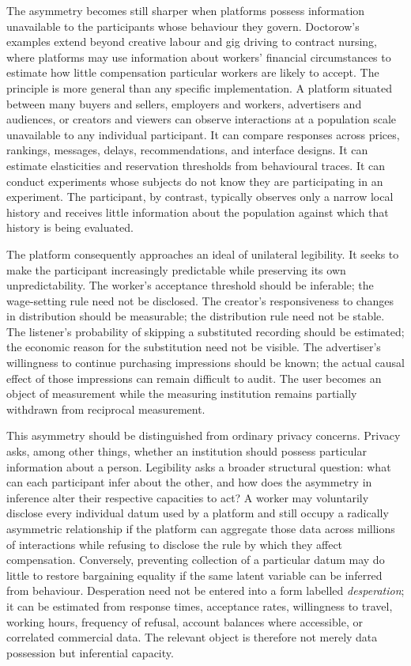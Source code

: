 \documentclass[11pt]{article}
\begin{document}
The asymmetry becomes still sharper when platforms possess information unavailable to the participants whose behaviour they govern. Doctorow's examples extend beyond creative labour and gig driving to contract nursing, where platforms may use information about workers' financial circumstances to estimate how little compensation particular workers are likely to accept. The principle is more general than any specific implementation. A platform situated between many buyers and sellers, employers and workers, advertisers and audiences, or creators and viewers can observe interactions at a population scale unavailable to any individual participant. It can compare responses across prices, rankings, messages, delays, recommendations, and interface designs. It can estimate elasticities and reservation thresholds from behavioural traces. It can conduct experiments whose subjects do not know they are participating in an experiment. The participant, by contrast, typically observes only a narrow local history and receives little information about the population against which that history is being evaluated.

The platform consequently approaches an ideal of unilateral legibility. It seeks to make the participant increasingly predictable while preserving its own unpredictability. The worker's acceptance threshold should be inferable; the wage-setting rule need not be disclosed. The creator's responsiveness to changes in distribution should be measurable; the distribution rule need not be stable. The listener's probability of skipping a substituted recording should be estimated; the economic reason for the substitution need not be visible. The advertiser's willingness to continue purchasing impressions should be known; the actual causal effect of those impressions can remain difficult to audit. The user becomes an object of measurement while the measuring institution remains partially withdrawn from reciprocal measurement.

This asymmetry should be distinguished from ordinary privacy concerns. Privacy asks, among other things, whether an institution should possess particular information about a person. Legibility asks a broader structural question: what can each participant infer about the other, and how does the asymmetry in inference alter their respective capacities to act? A worker may voluntarily disclose every individual datum used by a platform and still occupy a radically asymmetric relationship if the platform can aggregate those data across millions of interactions while refusing to disclose the rule by which they affect compensation. Conversely, preventing collection of a particular datum may do little to restore bargaining equality if the same latent variable can be inferred from behaviour. Desperation need not be entered into a form labelled \emph{desperation}; it can be estimated from response times, acceptance rates, willingness to travel, working hours, frequency of refusal, account balances where accessible, or correlated commercial data. The relevant object is therefore not merely data possession but inferential capacity.
\end{document}
